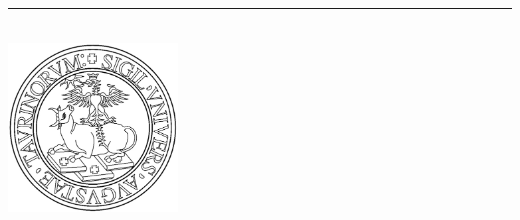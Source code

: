 %
\begin{titlepage}
	\flushright
	\hfill
	\vfill
	{\LARGE\thesisTitle \par}
	\rule[5pt]{\textwidth}{.4pt} \par
	{\Large\thesisName}
	\vfill
	\textit{\large\thesisDate}
\end{titlepage}


\begin{titlepage}
	\tgherosfont
	\centering

	{\Large \thesisUniversity} \\[4mm]
	\includegraphics[width=4.5cm]{gfx/logo} \\[2mm]
	\textsf{\large \thesisUniversityInstitute} \\
	\textsf{\large \thesisUniversityDepartment} \\

	\vfill
	{\large \thesisSubject} \\[5mm]
	{\LARGE \color{ctcolortitle}\textbf{\thesisTitle} \\[10mm]}
	{\Large \thesisName} \\


\end{titlepage}
